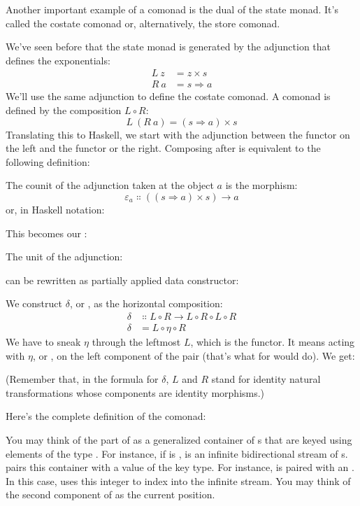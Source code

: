 Another important example of a comonad is the dual of the state monad.
It's called the costate comonad or, alternatively, the store comonad.

We've seen before that the state monad is generated by the adjunction
that defines the exponentials:
\begin{align*}
L\ z &= z\times{}s \\
R\ a &= s \Rightarrow a
\end{align*}
We'll use the same adjunction to define the costate comonad. A comonad
is defined by the composition $L \circ R$:
\[L\ (R\ a) = (s \Rightarrow a)\times{}s\]
Translating this to Haskell, we start with the adjunction between the
 functor on the left and the  functor or the
right. Composing  after  is equivalent to
the following definition:

The counit of the adjunction taken at the object $a$ is the
morphism:
\[\varepsilon_a \Colon ((s \Rightarrow a)\times{}s) \to a\]
or, in Haskell notation:

This becomes our :

The unit of the adjunction:

can be rewritten as partially applied data constructor:

We construct $\delta$, or , as the horizontal composition:
\begin{align*}
\delta &\Colon L \circ R \to L \circ R \circ L \circ R \\
\delta &= L \circ \eta \circ R
\end{align*}
We have to sneak $\eta$ through the leftmost $L$, which is the
 functor. It means acting with $\eta$, or , on
the left component of the pair (that's what  for
 would do). We get:

(Remember that, in the formula for $\delta$, $L$ and $R$ stand
for identity natural transformations whose components are identity
morphisms.)

Here's the complete definition of the  comonad:

You may think of the  part of  as a
generalized container of s that are keyed using elements of
the type . For instance, if  is ,
 is an infinite bidirectional stream of
s.  pairs this container with a value of the key
type. For instance,  is paired with an
. In this case,  uses this integer to index
into the infinite stream. You may think of the second component of
 as the current position.

